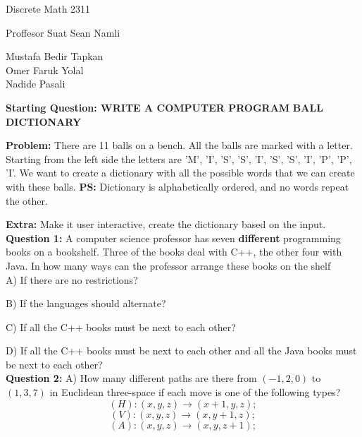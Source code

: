 \documentclass[11pt]{article}
\begin{document}
\begin{center}
Discrete Math 2311
\end{center}

\begin{center}
Proffesor Suat Sean Namli\\
\end{center}

\begin{center}
Mustafa Bedir Tapkan\\
Omer Faruk Yolal\\
Nadide Pasali\\
\end{center}

\newpage

\textbf{Starting Question: WRITE A COMPUTER PROGRAM} 
\textbf{BALL DICTIONARY}

\textbf{Problem:} There are 11 balls on a bench. All the balls are marked with a letter. 
Starting from the left side the letters are 'M', 'I', 'S', 'S', 'I', 'S', 'S', 'I', 'P', 'P', 'I'. We want to 
create a dictionary with all the possible words that we can create with these balls. %
 \textbf{PS:} Dictionary is alphabetically ordered, and no words repeat the other. %

\textbf{Extra:} Make it user interactive, create the dictionary based on the input.
\\

\textbf{Question 1:}  A computer science professor has seven \textbf{different} programming 
books on a bookshelf. Three of the books deal with C++, the other four with Java. In how 
many ways can the professor arrange these books on the shelf\\  %

A) If there are no restrictions?

B) If the languages should alternate?

C) If all the C++ books must be next to each other?

D) If all the C++ books must be next to each other and all the Java books must be next to each other?
\\

\textbf{Question 2:}  A) How many different paths are there from $(-1,2,0)$ to $(1,3,7)$ in Euclidean three-space if each move is one of the following types? %
$$(H):(x,y,z)\rightarrow(x+1,y,z);$$
$$(V):(x,y,z)\rightarrow(x,y+1,z);$$
$$(A):(x,y,z)\rightarrow(x,y,z+1);$$
\end{document}
